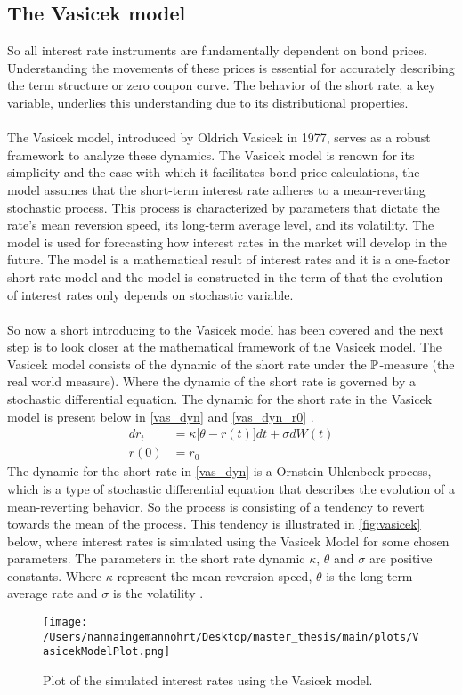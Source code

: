 \subsection{The Vasicek model}
So all interest rate instruments are fundamentally dependent on bond prices. Understanding the movements of 
these prices is essential for accurately describing the term structure or zero coupon curve. The behavior 
of the short rate, a key variable, underlies this understanding due to its distributional properties.
\\\\
The Vasicek model, introduced by Oldrich Vasicek in 1977, serves as a robust framework to analyze these dynamics.
The Vasicek model is renown for its simplicity and the ease with which it facilitates bond price calculations, 
the model assumes that the short-term interest rate adheres to a mean-reverting stochastic process. This process is characterized 
by parameters that dictate the rate's mean reversion speed, its long-term average level, and its volatility.
The model is used for forecasting how interest rates in the market will develop in the future. The model is a
mathematical result of interest rates and it is a one-factor short rate model and the model is constructed in the 
term of that the evolution of interest rates only depends on stochastic variable.
\\\\
So now a short introducing to the Vasicek model has been covered and the next step is to look closer at the 
mathematical framework of the Vasicek model. The Vasicek model consists of the dynamic of the short rate under the $\mathbb{P}$-measure
(the real world measure). Where the dynamic of the short rate is governed by a stochastic differential equation. 
The dynamic for the short rate in the Vasicek model is present below in \autoref{vas_dyn} and \autoref{vas_dyn_r0} \cite{Bjork}.
\begin{align}
    d r_t &= \kappa \Big[\theta -r(t)\Big] dt + \sigma d W(t) \label{vas_dyn}\\
    r(0) &= r_0 \label{vas_dyn_r0}
\end{align}
The dynamic for the short rate in \autoref{vas_dyn} is a Ornstein-Uhlenbeck process, which is a type of stochastic 
differential equation that describes the evolution of a mean-reverting behavior. So the process is consisting of a 
tendency to revert towards the mean of the process. This tendency is illustrated in \autoref{fig:vasicek} below, where 
interest rates is simulated using the Vasicek Model for some chosen parameters. The parameters in the short rate dynamic
$\kappa$, $\theta$ and $\sigma$ are positive constants. Where $\kappa$ represent the mean reversion speed, $\theta$ 
is the long-term average rate and $\sigma$ is the volatility \cite{Bermudan}.
\begin{figure}[h]
    \centering
    \texttt{[image: /Users/nannaingemannohrt/Desktop/master\_thesis/main/plots/VasicekModelPlot.png]}
    \caption{Plot of the simulated interest rates using the Vasicek model.}
    \label{fig:vasicek}
\end{figure}

